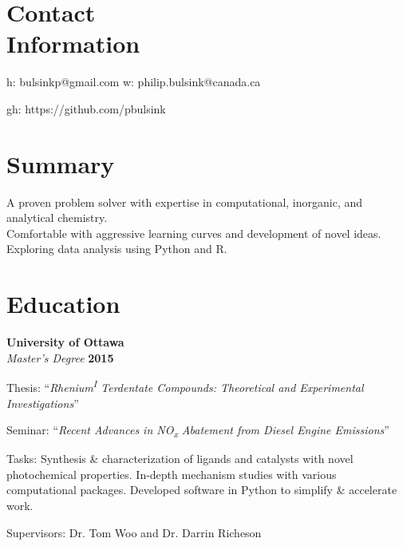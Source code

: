 \documentclass[margin,line]{resume}
\begin{document}
\thispagestyle{plain}
\begin{resume}

    \section{\mysidestyle Contact\\Information}
        
    h: bulsinkp@gmail.com \hspace{60mm} w: philip.bulsink@canada.ca
\vspace{-4.5mm}
    
    gh: https://github.com/pbulsink
    \\\vspace{-4.5mm}


    \section{\mysidestyle Summary}

    A proven problem solver with expertise in computational, inorganic, and analytical chemistry.\\ Comfortable with aggressive learning curves and development of novel ideas.\\ Exploring data analysis using Python and R.


    \section{\mysidestyle Education}

    \textbf{University of Ottawa}\\\vspace{1mm}%
    \textsl{Master's Degree} \hfill \textbf{2015}\vspace{-3mm}\\\vspace{-1mm}%
    \begin{list2}
        \item Thesis: ``\textit{Rhenium\textsuperscript{I} Terdentate Compounds: Theoretical and Experimental Investigations}''
        \item Seminar: ``\textit{Recent Advances in NO\textsubscript{x} Abatement from Diesel Engine Emissions}''
        \item Tasks: Synthesis \& characterization of ligands and catalysts with novel photochemical properties.
        In-depth mechanism studies with various computational packages.
        Developed software in Python to simplify \& accelerate work.
        \item Supervisors: Dr. Tom Woo and Dr. Darrin Richeson
    \end{list2}


\end{resume}
\end{document}
